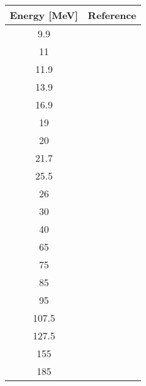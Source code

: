\begin{tabular}{c c} 
    \toprule 
    \bf{Energy [MeV]} & \bf{Reference} \\
    \midrule
    9.9 & \cite{Tornow82}\\
    11 & \cite{Rapaport77}\\
    11.9 & \cite{Tornow82}\\
    13.9 & \cite{Honore86}\\
    16.9 & \cite{Honore86}\\
    19 & \cite{Alarcon87}\\
    20 & \cite{Rapaport77}\\
    21.7 & \cite{Alarcon87}\\
    25.5 & \cite{Alarcon87}\\
    26 & \cite{Rapaport77}\\
    30 & \cite{Devito81}\\
    40 & \cite{Devito81}\\
    65 & \cite{Hjort94}\\
    75 & \cite{Osborne04}\\
    85 & \cite{Osborne04}\\
    95 & \cite{Osborne04}\\
    107.5 & \cite{Osborne04}\\
    127.5 & \cite{Osborne04}\\
    155 & \cite{Osborne04}\\
    185 & \cite{Osborne04}\\
    \bottomrule
\end{tabular}
